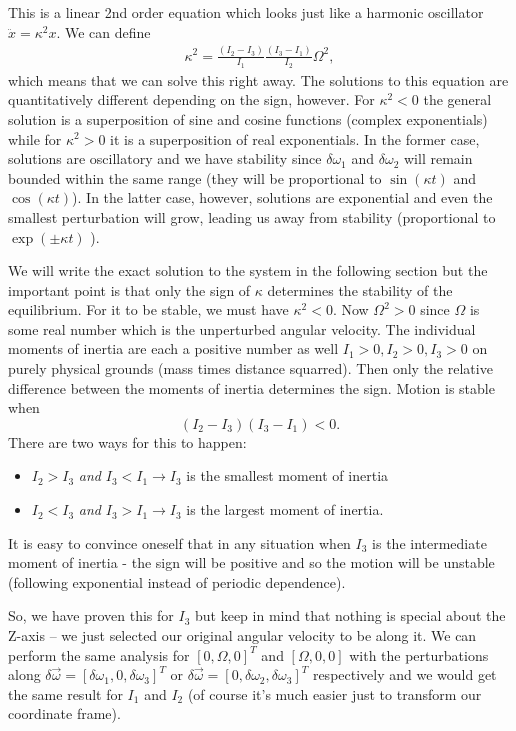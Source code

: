 \documentclass[a4paper]{article}
\begin{document}
	This is a linear 2nd order equation which looks just like a harmonic oscillator $\ddot{x} = \kappa^2 x$.
	We can define
	\begin{eqnarray}\label{kappa_eq}
		\kappa^2 = \frac{( I_2 - I_3 )}{I_1}\frac{( I_3 - I_1 )}{I_2}\Omega^2,
	\end{eqnarray}
	which means that we can solve this right away.
	The solutions to this equation are quantitatively different depending on the sign, however.
	For $\kappa^2 < 0$ the general solution is a superposition of sine and cosine functions (complex exponentials) while for $\kappa^2 > 0$ it is a superposition of real exponentials.
	In the former case, solutions are oscillatory and we have stability since $\delta \omega_1$ and $\delta \omega_2$ will remain bounded within the same range (they will be proportional to $\sin( \kappa t )$ and $\cos( \kappa t )$).
	In the latter case, however, solutions are exponential and even the smallest perturbation will grow, leading us away from stability (proportional to $\exp( \pm \kappa t )$ ).

	We will write the exact solution to the system in the following section but the important point is that only the sign of $\kappa$ determines the stability of the equilibrium.
	For it to be stable, we must have $\kappa^2 < 0$.
	Now $\Omega^2 > 0$ since $\Omega$ is some real number which is the unperturbed angular velocity.
	The individual moments of inertia are each a positive number as well $ I_1 > 0, I_2 > 0, I_3 > 0 $ on purely physical grounds (mass times distance squarred).
	Then only the relative difference between the moments of inertia determines the sign.
	Motion is stable when $$ ( I_2 - I_3 )( I_3 - I_1 ) < 0. $$
	There are two ways for this to happen:
	\begin{itemize}
		\item $ I_2 > I_3 $ \textit{and} $ I_3 < I_1 \rightarrow I_3 $ is the smallest moment of inertia
		\item $ I_2 < I_3 $ \textit{and} $ I_3 > I_1 \rightarrow I_3 $ is the largest moment of inertia.
	\end{itemize}
	It is easy to convince oneself that in any situation when $I_3$ is the intermediate moment of inertia - the sign will be positive and so the motion will be unstable (following exponential instead of periodic dependence).

	So, we have proven this for $I_3$ but keep in mind that nothing is special about the Z-axis -- we just selected our original angular velocity to be along it.
	We can perform the same analysis for $[ 0 , \Omega , 0 ]^T$ and $[ \Omega , 0 , 0 ]$ with the perturbations along $\delta\vec{\omega} = [ \delta\omega_1 , 0 , \delta\omega_3 ]^T $ or $\delta\vec{\omega} = [ 0 , \delta\omega_2 , \delta\omega_3 ]^T $ respectively and we would get the same result for $I_1$ and $I_2$ (of course it's much easier just to transform our coordinate frame).
	
\end{document}
